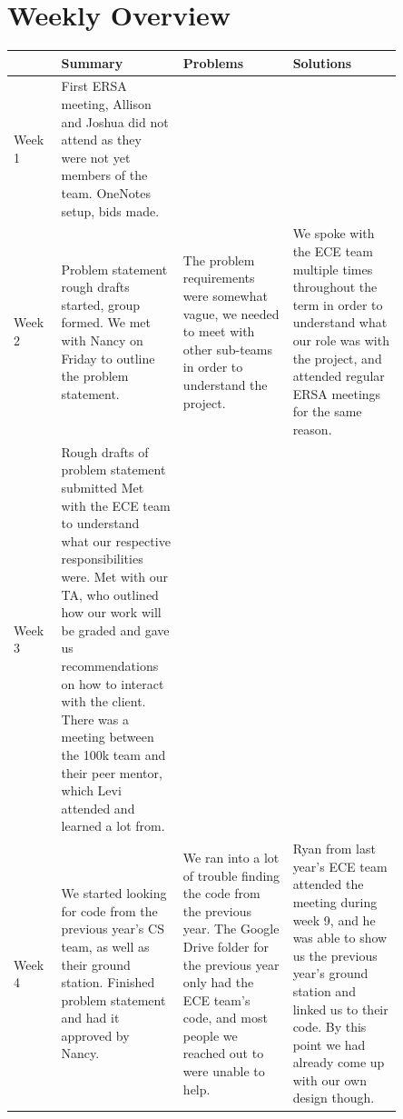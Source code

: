 \documentclass[onecolumn, draftclsnofoot, 10pt, compsoc]{IEEEtran}
\begin{document}

\section{Weekly Overview}

\begin{tabular}{ | p{0.1\linewidth} | p{0.25\linewidth} | p{0.25\linewidth} | p{0.25\linewidth} | }
\hline
&
Summary&
Problems&
Solutions\\\hline
Week 1&
First ERSA meeting, Allison and Joshua did not attend as they were not yet members of the team. OneNotes setup, bids made.&
&\\\hline
Week 2&
Problem statement rough drafts started, group formed.  We met with Nancy on Friday to outline the problem statement.&
The problem requirements were somewhat vague, we needed to meet with other sub-teams in order to understand the project.&
We spoke with the ECE team multiple times throughout the term in order to understand what our role was with the project, and attended regular ERSA meetings for the same reason.\\\hline

Week 3&
Rough drafts of problem statement submitted
Met with the ECE team to understand what our respective responsibilities were.
Met with our TA, who outlined how our work will be graded and gave us recommendations on how to interact with the client.
There was a meeting between the 100k team and their peer mentor, which Levi attended and learned a lot from.&
&\\\hline

Week 4&
We started looking for code from the previous year’s CS team, as well as their ground station.
Finished problem statement and had it approved by Nancy.&
We ran into a lot of trouble finding the code from the previous year. The Google Drive folder for the previous year only had the ECE team’s code, and most people we reached out to were unable to help.&
Ryan from last year’s ECE team attended the meeting during week 9, and he was able to show us the previous year’s ground station and linked us to their code. By this point we had already come up with our own design though.\\\hline
\end{tabular}
\end{document}
